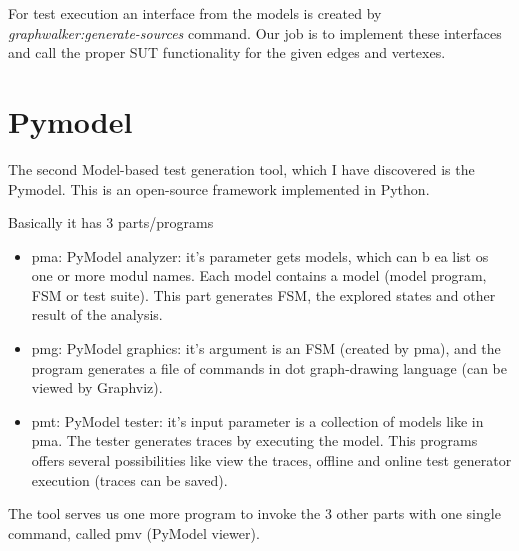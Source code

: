 For test execution an interface from the models is created by \textit{graphwalker:generate-sources} command. Our job is to implement these interfaces and call the proper SUT functionality for the given edges and vertexes.

\section{Pymodel}

The second Model-based test generation tool, which I have discovered is the Pymodel. This is an open-source framework implemented in Python. 

Basically it has 3 parts/programs
\begin{itemize}
	\item pma: PyModel analyzer: it's parameter gets models, which can b ea list os one or more modul names.  Each model contains a model (model program, FSM or test suite). This part generates FSM, the explored states and other result of the analysis.
	\item pmg: PyModel graphics: it's argument is an FSM (created by pma), and the program generates a file of commands in dot graph-drawing language (can be viewed by Graphviz). 
	\item pmt: PyModel tester: it's input parameter is a collection of models like in pma. The tester generates traces by executing the model. This programs offers several possibilities like view the traces, offline and online test generator execution (traces can be saved). 
\end{itemize}

The tool serves us one more program to invoke the 3 other parts with one single command, called pmv (PyModel viewer).
